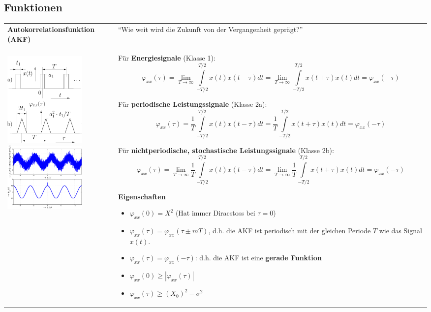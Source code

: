 \subsection{Funktionen}
\begin{tabular}{ll}
\textbf{Autokorrelationsfunktion (AKF)}
	& ``Wie weit wird die Zukunft von der Vergangenheit geprägt?'' \\
\parbox{6cm}{
	\\
	\includegraphics[width=4cm]{./bilder/akf1.png}\\
	\includegraphics[width=4cm]{./bilder/akf2.png}
	} 
	& \parbox{12cm}{
	Für \textbf{Energiesignale} (Klasse 1):
	$$\varphi_{xx}(\tau) = \lim_{T\to\infty}\int\limits_{-T/2}^{T/2}
	x(t)x(t-\tau)dt=
	\lim_{T\to\infty}\int\limits_{-T/2}^{T/2} x(t+\tau)x(t)dt =
	\varphi_{xx}(-\tau)$$
	
	Für \textbf{periodische Leistungssignale} (Klasse 2a):
	$$\varphi_{xx}(\tau) = \frac {1} {T}
	\int\limits_{-T/2}^{T/2} x(t)x(t-\tau)dt 
	= \frac {1} {T} \int\limits_{-T/2}^{T/2} x(t+\tau)x(t)dt =
	\varphi_{xx}(-\tau)$$
	
	Für \textbf{nichtperiodische, stochastische Leistungssignale} (Klasse 2b):
	$$\varphi_{xx}(\tau) = \lim_{T\rightarrow\infty} \frac {1} {T}
	\int\limits_{-T/2}^{T/2} x(t)x(t-\tau)dt=\lim_{T\rightarrow\infty}\frac {1}
	{T} \int\limits_{-T/2}^{T/2} x(t+\tau)x(t)dt = \varphi_{xx}(-\tau)$$
	
	\textbf{Eigenschaften}
	\begin{itemize}
     \item $\varphi_{xx}(0) = X^2$ (Hat immer Diracstoss bei $\tau = 0$)
     \item $\varphi_{xx}(\tau)=\varphi_{xx}(\tau\pm mT)$, d.h. die
     AKF ist periodisch mit der gleichen Periode
     $T$ wie das Signal $x(t)$.
	\item $\varphi_{xx}(\tau)=\varphi_{xx}(-\tau)$: d.h. die AKF ist eine {\bf
	gerade Funktion}
	\item $\varphi_{xx}(0)\geq|\varphi_{xx}(\tau)|\quad$
	\item $\varphi_{xx}(\tau)\geq (X_0)^2-\sigma^2\quad$
   \end{itemize}
   
}
\end{tabular}

